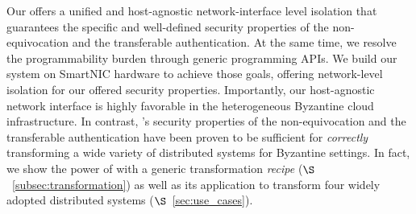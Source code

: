 

 Our \projecttitle{} offers a unified and host-agnostic network-interface level isolation that guarantees the specific and well-defined security properties of the non-equivocation and the transferable authentication. At the same time, we resolve the programmability burden through generic programming APIs. We build our \projecttitle{} system on SmartNIC hardware to achieve those goals, offering network-level isolation for our offered security properties. Importantly, our host-agnostic \projecttitle{} network interface is highly favorable in the heterogeneous Byzantine cloud infrastructure. In contrast, \projecttitle{}'s security properties of the non-equivocation and the transferable authentication have been proven to be sufficient for {\em correctly} transforming a wide variety of distributed systems for Byzantine settings. In fact, we show the power of \projecttitle{} with a generic transformation {\em recipe} ($\S$~\ref{subsec:transformation}) as well as its application to transform four widely adopted distributed systems ($\S$~\ref{sec:use_cases}).

